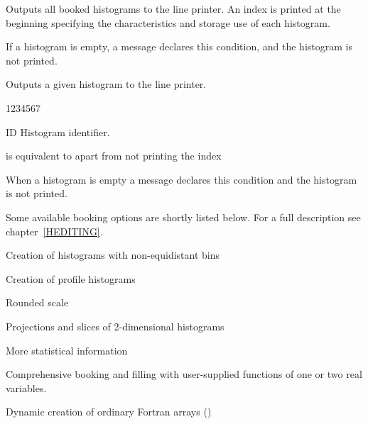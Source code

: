 \label{HEDITSEC}
 
 
\Action
Outputs all booked histograms to the line printer.
An index is printed at
the beginning specifying the characteristics and storage use of each
histogram.
 
\Remark
\begin{UL}
\item If a histogram is empty, a message declares this condition, and the
      histogram is not printed.
\end{UL}
 
\condbreak{6cm}
 
\Action Outputs a given histogram to the line printer.
 
\begin{DLtt}{1234567}
\item[ID]  Histogram identifier.
\end{DLtt}
 
\Remarks
\begin{UL}
\item {} is equivalent to
       apart from not printing the index
\item When a histogram is empty a message declares this
      condition and the histogram is not printed.
\end{UL}
\medskip
Some available booking options are shortly listed below.
For a full description see chapter~\ref{HEDITING}.
 
\begin{UL}
\item Creation of histograms with non-equidistant bins
\item Creation of profile histograms
\item Rounded scale
\item Projections and slices of 2-dimensional histograms
\item More statistical information
\item Comprehensive booking and filling with
      user-supplied functions of one or two real variables.
\item Dynamic creation of ordinary Fortran arrays ()
\end{UL}
 
\label{HCOREDEL}
 
